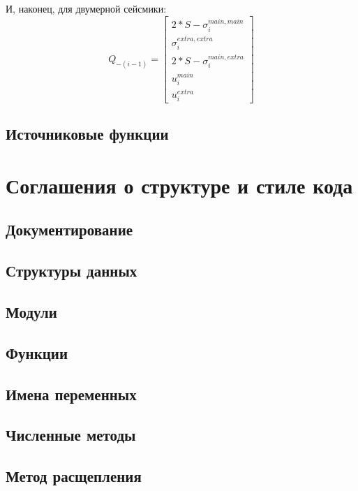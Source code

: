 \documentclass{article}
\begin{document}
\indent
И, наконец, для двумерной сейсмики:
$$Q_{-(i-1)} = \left[ \begin{array}{c}
                      2 * S - \sigma^{main, main}_i \\
                      \sigma^{extra, extra}_i \\
                      2 * S - \sigma^{main, extra}_i \\
                      u^{main}_i \\
                      u^{extra}_i
                      \end{array}    \right] $$


\subsection{Источниковые функции}

\section{Соглашения о структуре и стиле кода}
\subsection{Документирование}

\subsection{Структуры данных}

\subsection{Модули}

\subsection{Функции}

\subsection{Имена переменных}

\subsection{Численные методы}
\subsection{Метод расщепления}
\end{document}
